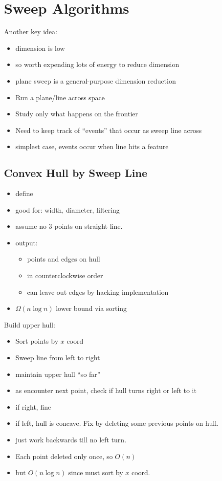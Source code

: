 \documentclass{article}
\begin{document}
\section{Sweep Algorithms}

Another key idea: 
\begin{itemize}
\item dimension is low 
\item so worth expending lots of energy to reduce dimension
\item plane sweep is a general-purpose dimension reduction
\item Run a plane/line across space
\item Study only what happens on the frontier
\item Need to keep track of ``events'' that occur as sweep line across
\item simplest case, events occur when line hits a feature
\end{itemize}

\subsection{Convex Hull by Sweep Line}
\begin{itemize}
\item define
\item good for: width, diameter, filtering
\item assume no 3 points on straight line.
\item output:
  \begin{itemize}
  \item points and edges on hull
  \item in counterclockwise order
  \item can leave out edges by hacking implementation
  \end{itemize}
\item $\Omega(n\log n)$ lower bound via sorting
\end{itemize}

Build upper hull:
\begin{itemize}
\item Sort points by $x$ coord
\item Sweep line from left to right
\item maintain upper hull ``so far''
\item as encounter next point, check if hull turns right or left to it
\item if right, fine
\item if left, hull is concave.  Fix by deleting some previous points
  on hull.
\item just work backwards till no left turn.
\item Each point deleted only once, so $O(n)$
\item but $O(n\log n)$ since must sort by $x$ coord.
\end{itemize}
\end{document}
